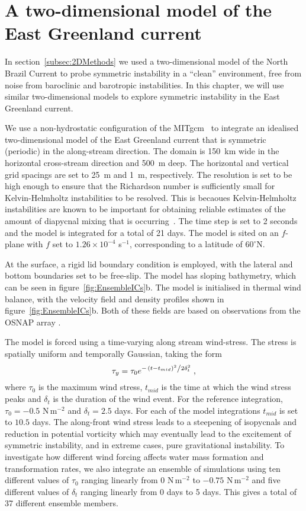 \section{A two-dimensional model of the East Greenland current}
\label{sec:Irm2DMeth}
In section~\ref{subsec:2DMethods} we used a two-dimensional model of the North Brazil Current to probe symmetric instability in a ``clean'' environment, free from noise from baroclinic and barotropic instabilities. In this chapter, we will use similar two-dimensional models to explore symmetric instability in the East Greenland current.

We use a non-hydrostatic configuration of the MITgcm~\citep{Marshall1997} to integrate an idealised two-dimensional model of the East Greenland current that is symmetric (periodic) in the along-stream direction. The domain is 150~km wide in the horizontal cross-stream direction and 500~m deep. The horizontal and vertical grid spacings are set to 25~m and 1~m, respectively. The resolution is set to be high enough to ensure that the Richardson number is sufficiently small for Kelvin-Helmholtz instabilities to be resolved. This is becaoues Kelvin-Helmholtz instabilities are known to be important for obtaining reliable estimates of the amount of diapycnal mixing that is occurring~\citep{Griffiths2003a, Yankovsky2019}. The time step is set to 2 seconds and the model is integrated for a total of 21 days. The model is sited on an $f$-plane with $f$ set to $1.26 \times 10^{-4}$ s$^{-1}$, corresponding to a latitude of $60^\circ$N. 

At the surface, a rigid lid boundary condition is employed, with the lateral and bottom boundaries set to be free-slip. The model has sloping bathymetry, which can be seen in  figure~\ref{fig:EnsembleICs}b. The model is initialised in thermal wind balance, with the velocity field and density profiles shown in figure~\ref{fig:EnsembleICs}b. Both of these fields are based on observations from the OSNAP array \citep{LeBras2022}.

The model is forced using a time-varying along stream wind-stress. The stress is spatially uniform and temporally Gaussian, taking the form
\begin{equation}
    \tau_y = \tau_0 e^{-\flatfrac{(t - t_{mid})^2}{2\delta_t^2}} \, ,
\end{equation}
where $\tau_0$ is the maximum wind stress, $t_{mid}$ is the time at which the wind stress peaks and $\delta_t$ is the duration of the wind event. For the reference integration, $\tau_0 = - 0.5$ N\,m$^{-2}$ and $\delta_t = 2.5$ days. For each of the model integrations $t_{mid}$ is set to $10.5$ days. The along-front wind stress leads to a steepening of isopycnals and reduction in potential vorticity which may eventually lead to the excitement of symmetric instability, and in extreme cases, pure gravitational instability. To investigate how different wind forcing affects water mass formation and transformation rates, we also integrate an ensemble of simulations using ten different values of $\tau_0$ ranging linearly from $0$ N\,m$^{-2}$ to $-0.75$ N\,m$^{-2}$ and five different values of $\delta_t$ ranging linearly from 0 days to 5 days. This gives a total of 37 different ensemble members.

